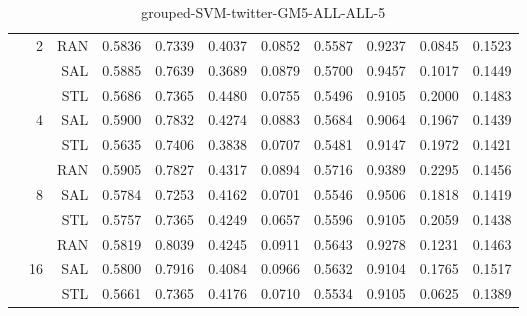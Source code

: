 \begin{center}
\begin{table}[htbp]
\begin{center}
\begin{tabular}{ | r | r | r | r | r | r | r | r | r | r | r |}
 & \multirow{3}{*}{2} & RAN & 0.5836 & 0.7339 & 0.4037 & 0.0852 & 0.5587 & 0.9237 & 0.0845 & 0.1523\\ \cline{3-11}
 &   & SAL & 0.5885 & 0.7639 & 0.3689 & 0.0879 & 0.5700 & 0.9457 & 0.1017 & 0.1449\\ \cline{3-11}
 &   & STL & 0.5686 & 0.7365 & 0.4480 & 0.0755 & 0.5496 & 0.9105 & 0.2000 & 0.1483\\ \cline{2-11}
 & \multirow{3}{*}{4} & SAL & 0.5900 & 0.7832 & 0.4274 & 0.0883 & 0.5684 & 0.9064 & 0.1967 & 0.1439\\ \cline{3-11}
 &   & STL & 0.5635 & 0.7406 & 0.3838 & 0.0707 & 0.5481 & 0.9147 & 0.1972 & 0.1421\\ \cline{3-11}
 &   & RAN & 0.5905 & 0.7827 & 0.4317 & 0.0894 & 0.5716 & 0.9389 & 0.2295 & 0.1456\\ \cline{2-11}
 & \multirow{3}{*}{8} & SAL & 0.5784 & 0.7253 & 0.4162 & 0.0701 & 0.5546 & 0.9506 & 0.1818 & 0.1419\\ \cline{3-11}
 &   & STL & 0.5757 & 0.7365 & 0.4249 & 0.0657 & 0.5596 & 0.9105 & 0.2059 & 0.1438\\ \cline{3-11}
 &   & RAN & 0.5819 & 0.8039 & 0.4245 & 0.0911 & 0.5643 & 0.9278 & 0.1231 & 0.1463\\ \cline{2-11}
 & \multirow{3}{*}{16} & SAL & 0.5800 & 0.7916 & 0.4084 & 0.0966 & 0.5632 & 0.9104 & 0.1765 & 0.1517\\ \cline{3-11}
 &   & STL & 0.5661 & 0.7365 & 0.4176 & 0.0710 & 0.5534 & 0.9105 & 0.0625 & 0.1389\\ \cline{3-11}
\hline
\end{tabular}
\caption{grouped-SVM-twitter-GM5-ALL-ALL-5}
\end{center}
 \end{table}
\end{center}


